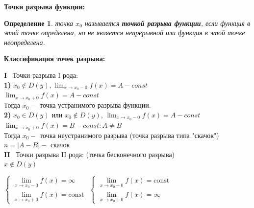 \documentclass[12pt, a4paper]{article}
\newtheorem{definition}{Определение}[subsection]
\theoremstyle{remark}
\begin{document}
	\begin{center}
		\textbf{Точки разрыва функции:}
	\end{center}
	
	\begin{definition}
		точка $x_0$ называется \textbf{точкой разрыва функции}, если функция в этой точке определена, но не является непрерывной или функция в этой точке неопределена.
	\end{definition}
	
	\begin{center}
		\textbf{Классификация точек разрыва:}
	\end{center}
	
	\textbf{I} \ Точки разрыва I рода: \\
	
	\textbf{1)} $x_0 \notin D(y), \lim_{x \to x_0 - 0} f(x) = A - const$ \\
	
	\hspace{2.6 cm}$\lim_{x \to x_0 + 0} f(x) = A - const$ \\
	
	Тогда $x_0 -$ точка устранимого разрыва функции. \\
	
	\textbf{2)} $x_0 \in D(y)$ или $x_0 \notin D(y)$, $\lim_{x \to x_0 - 0} f(x) = A - const$ \\
	
	\hspace{5.4 cm}$\lim_{x \to x_0 + 0} f(x) = B - const: A \neq B$ \\
	
	Тогда $x_0 -$ точка неустранимого разрыва (точка разрыва типа "скачок") \\
	
	$n = |A - B| -$ скачок \\
	
	\textbf{II} \ Точки разрыва II рода: (точка бесконечного разрыва) \\
	
	$x \notin D(y)$ \\
	
	\begin{center}
		$
		\begin{cases}
			\lim\limits_{x \to x_0-0} f(x) = \infty \\[10pt]
			\lim\limits_{x \to x_0+0} f(x) = \text{const}
		\end{cases}
		$
		\hspace{2cm} %
		$
		\begin{cases}
			\lim\limits_{x \to x_0-0} f(x) = \text{const} \\[10pt]
			\lim\limits_{x \to x_0+0} f(x) = \infty
		\end{cases}
		$
	\end{center}
	
\end{document}
